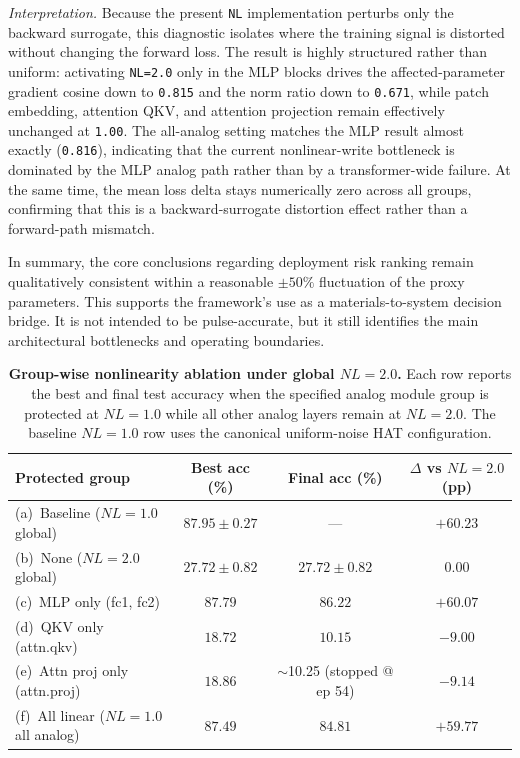 \textit{Interpretation.} Because the present \texttt{NL} implementation perturbs only the backward surrogate, this diagnostic isolates where the training signal is distorted without changing the forward loss. The result is highly structured rather than uniform: activating \texttt{NL=2.0} only in the MLP blocks drives the affected-parameter gradient cosine down to \texttt{0.815} and the norm ratio down to \texttt{0.671}, while patch embedding, attention QKV, and attention projection remain effectively unchanged at \texttt{1.00}. The all-analog setting matches the MLP result almost exactly (\texttt{0.816}), indicating that the current nonlinear-write bottleneck is dominated by the MLP analog path rather than by a transformer-wide failure. At the same time, the mean loss delta stays numerically zero across all groups, confirming that this is a backward-surrogate distortion effect rather than a forward-path mismatch.

In summary, the core conclusions regarding deployment risk ranking remain qualitatively consistent within a reasonable $\pm 50\%$ fluctuation of the proxy parameters. This supports the framework's use as a materials-to-system decision bridge. It is not intended to be pulse-accurate, but it still identifies the main architectural bottlenecks and operating boundaries.


\begin{table}[ht]
    \centering
    \caption{\textbf{Group-wise nonlinearity ablation under global $NL=2.0$.} Each row reports the best and final test accuracy when the specified analog module group is protected at $NL=1.0$ while all other analog layers remain at $NL=2.0$. The baseline $NL=1.0$ row uses the canonical uniform-noise HAT configuration.}
    \label{tab:supp-nl-ablation}
    \small
    \setlength{\tabcolsep}{5pt}
    \begin{tabular}{@{}lccc@{}}
        \toprule
        Protected group & Best acc (\%) & Final acc (\%) & $\Delta$ vs $NL=2.0$ (pp) \\
        \midrule
        (a)~Baseline ($NL=1.0$ global) & $87.95\pm0.27$ & — & $+60.23$ \\
        (b)~None ($NL=2.0$ global) & $27.72\pm0.82$ & $27.72\pm0.82$ & $0.00$ \\
        (c)~MLP only (fc1, fc2) & $87.79$ & $86.22$ & $+60.07$ \\
        (d)~QKV only (attn.qkv) & $18.72$ & $10.15$ & $-9.00$ \\
        (e)~Attn proj only (attn.proj) & $18.86$ & $\sim$10.25 (stopped @ ep 54) & $-9.14$ \\
        (f)~All linear ($NL=1.0$ all analog) & $87.49$ & $84.81$ & $+59.77$ \\
        \bottomrule
    \end{tabular}
\end{table}

